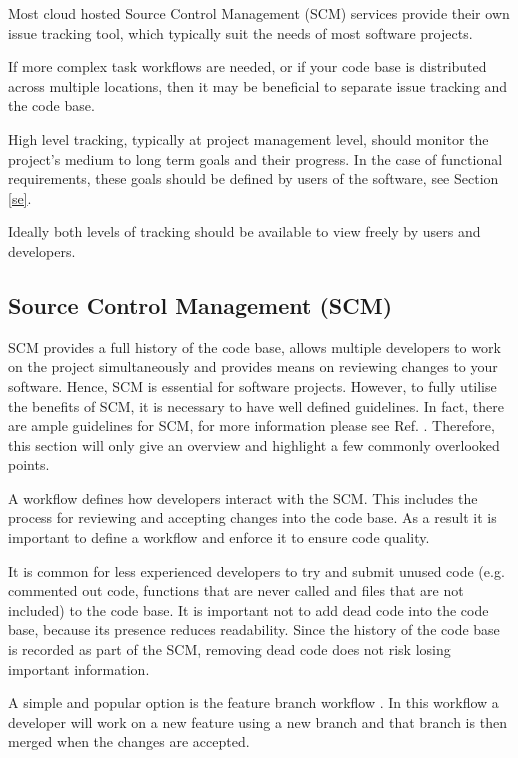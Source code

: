 \documentclass[jnr]{iosart2x}
\begin{document}
Most cloud hosted Source Control Management (SCM) services provide their own issue tracking tool, which typically suit the needs of most software projects.

If more complex task workflows are needed, or if your code base is distributed across multiple locations, then it may be beneficial to separate issue tracking and the code base.

High level tracking, typically at project management level, should monitor the project's medium to long term goals and their progress.
In the case of functional requirements, these goals should be defined by users of the software, see Section \ref{se}.

Ideally both levels of tracking should be available to view freely by users and developers.

\subsection{Source Control Management (SCM)}
\label{Source control management}

SCM provides a full history of the code base, allows multiple developers to work on the project simultaneously and provides means on reviewing changes to your software.
Hence, SCM is essential for software projects.
However, to fully utilise the benefits of SCM, it is necessary to have well defined guidelines.
In fact, there are ample guidelines for SCM, for more information please see Ref. \cite{awesome-git}.
Therefore, this section will only give an overview and highlight a few commonly overlooked points.

A workflow defines how developers interact with the SCM.
This includes the process for reviewing and accepting changes into the code base.
As a result it is important to define a workflow and enforce it to ensure code quality.

It is common for less experienced developers to try and submit unused code (e.g. commented out code, functions that are never called and files that are not included) to the code base.
It is important not to add dead code into the code base, because its presence reduces readability.
Since the history of the code base is recorded as part of the SCM, removing dead code does not risk losing important information.

A simple and popular option is the feature branch workflow \cite{feature-branch}.
In this workflow a developer will work on a new feature using a new branch and that branch is then merged when the changes are accepted.
\end{document}

